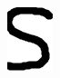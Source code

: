 \documentclass[russian,utf8,emptystyle]{eskdtext}
\begin{document}
\begin{figure}[!htb]
\includegraphics[width=\linewidth]{../data/learn/s/001}
\endminipage\hfill
{}

\end{figure}
\end{document}
